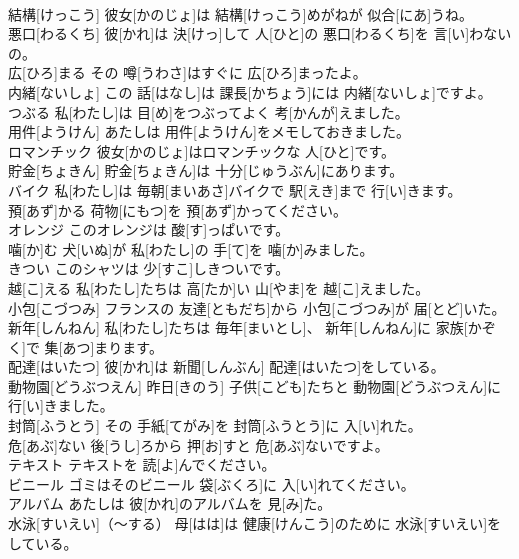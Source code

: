 \documentclass[8pt]{extreport}
\begin{document}
\begin{CJK}{UTF8}{min}
\\	結構[けっこう]	彼女[かのじょ]は 結構[けっこう]めがねが 似合[にあ]うね。		
\\	悪口[わるくち]	彼[かれ]は 決[けっ]して 人[ひと]の 悪口[わるくち]を 言[い]わないの。		
\\	広[ひろ]まる	その 噂[うわさ]はすぐに 広[ひろ]まったよ。		
\\	内緒[ないしょ]	この 話[はなし]は 課長[かちょう]には 内緒[ないしょ]ですよ。		
\\	つぶる	私[わたし]は 目[め]をつぶってよく 考[かんが]えました。		
\\	用件[ようけん]	あたしは 用件[ようけん]をメモしておきました。		
\\	ロマンチック	彼女[かのじょ]はロマンチックな 人[ひと]です。		
\\	貯金[ちょきん]	貯金[ちょきん]は 十分[じゅうぶん]にあります。		
\\	バイク	私[わたし]は 毎朝[まいあさ]バイクで 駅[えき]まで 行[い]きます。		
\\	預[あず]かる	荷物[にもつ]を 預[あず]かってください。		
\\	オレンジ	このオレンジは 酸[す]っぱいです。		
\\	噛[か]む	犬[いぬ]が 私[わたし]の 手[て]を 噛[か]みました。		
\\	きつい	このシャツは 少[すこ]しきついです。		
\\	越[こ]える	私[わたし]たちは 高[たか]い 山[やま]を 越[こ]えました。		
\\	小包[こづつみ]	フランスの 友達[ともだち]から 小包[こづつみ]が 届[とど]いた。		
\\	新年[しんねん]	私[わたし]たちは 毎年[まいとし]、 新年[しんねん]に 家族[かぞく]で 集[あつ]まります。		
\\	配達[はいたつ]	彼[かれ]は 新聞[しんぶん] 配達[はいたつ]をしている。		
\\	動物園[どうぶつえん]	昨日[きのう] 子供[こども]たちと 動物園[どうぶつえん]に 行[い]きました。		
\\	封筒[ふうとう]	その 手紙[てがみ]を 封筒[ふうとう]に 入[い]れた。		
\\	危[あぶ]ない	後[うし]ろから 押[お]すと 危[あぶ]ないですよ。		
\\	テキスト	テキストを 読[よ]んでください。		
\\	ビニール	ゴミはそのビニール 袋[ぶくろ]に 入[い]れてください。		
\\	アルバム	あたしは 彼[かれ]のアルバムを 見[み]た。		
\\	水泳[すいえい]（～する）	母[はは]は 健康[けんこう]のために 水泳[すいえい]をしている。		

\end{CJK}
\end{document}
